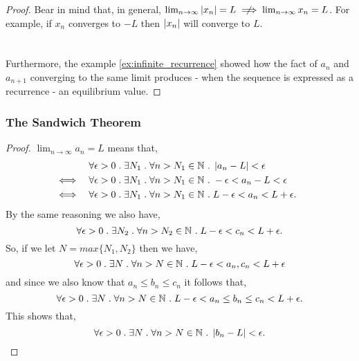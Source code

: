 \documentclass[MathsNotesBase.tex]{subfiles}
\begin{document}
{\begin{proof}
			Bear in mind that, in general, ${ \lim_{n \to \infty} \abs{x_n} = L \centernot\implies \lim_{n \to \infty} x_n = L }$. For example, if $x_n$ converges to $-L$ then $\left\lvert x_n\right\rvert$ will converge to $L$.\\
			\href{https://github.com/mcopeland2001/maths-notes/blob/master/resources/code/python/converge_to_minus_2.py}{\scriptsize{}}\\\\
			
			Furthermore, the example \ref{ex:infinite_recurrence} showed how the fact of $a_n$ and $a_{n+1}$ converging to the same limit produces - when the sequence is expressed as a recurrence - an equilibrium value.
		\end{proof}
	
		\subsubsection{The Sandwich Theorem}
		\begin{proof}
			${ \lim_{n \to \infty} a_n = L }$ means that,
			\begin{align*}
			&& \forall \epsilon > 0 \;.\; \exists N_1 \;.\; \forall n > N_1 \in \mathbb{N}^{} &\;.\; \left\lvert a_n - L\right\rvert < \epsilon  &\text{\scriptsize{}} \\
			&\iff & \forall \epsilon > 0 \;.\; \exists N_1 \;.\; \forall n > N_1 \in \mathbb{N}^{} &\;.\; -\epsilon < a_n - L < \epsilon  &\text{\scriptsize{}} \\
			&\iff & \forall \epsilon > 0 \;.\; \exists N_1 \;.\; \forall n > N_1 \in \mathbb{N}^{} &\;.\; L - \epsilon < a_n < L + \epsilon.  &\text{\scriptsize{}}
			\end{align*}
			By the same reasoning we also have,
			\[ \forall \epsilon > 0 \;.\; \exists N_2 \;.\; \forall n > N_2 \in \mathbb{N}^{} \;.\; L - \epsilon < c_n < L + \epsilon. \]
			So, if we let ${ N = max\{N_1, N_2\} }$ then we have,
			\[ \forall \epsilon > 0 \;.\; \exists N \;.\; \forall n > N \in \mathbb{N}^{} \;.\; L - \epsilon < a_n, c_n < L + \epsilon \]
			and since we also know that ${ a_n \leq b_n \leq c_n }$ it follows that,
			\[ \forall \epsilon > 0 \;.\; \exists N \;.\; \forall n > N \in \mathbb{N}^{} \;.\; L - \epsilon < a_n \leq b_n \leq c_n < L + \epsilon. \]
			This shows that,
			\[ \forall \epsilon > 0 \;.\; \exists N \;.\; \forall n > N \in \mathbb{N}^{} \;.\; \left\lvert b_n - L\right\rvert < \epsilon. \]
		\end{proof}
	
}
\end{document}
